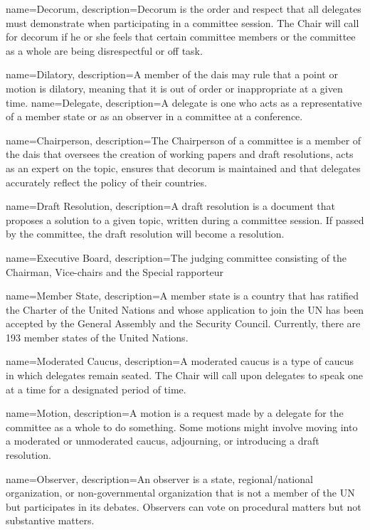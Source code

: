 {
	name={Decorum},
	description={Decorum is the order and respect that all delegates must demonstrate when participating in a committee session. The Chair will call for decorum if he or she feels that certain committee members or the committee as a whole are being disrespectful or off task.}

{
	name={Dilatory},
	description={A member of the dais may rule that a point or motion is dilatory, meaning that it is out of order or inappropriate at a given time.}
}
{
	name={Delegate},
	description={A delegate is one who acts as a representative of a member state or as an observer in a committee at a conference.}
}

{
	name={Chairperson},
	description={The Chairperson of a committee is a member of the dais that oversees the creation of working papers and draft resolutions, acts as an expert on the topic, ensures that decorum is maintained and that delegates accurately reflect the policy of their countries.}
}

{
	name={Draft Resolution},
	description={A draft resolution is a document that proposes a solution to a given topic, written during a committee session. If passed by the committee, the draft resolution will become a resolution.}
}

{
	name={Executive Board},
	description={The judging committee consisting of the Chairman, Vice-chairs and the Special rapporteur}
}

{
	name={Member State},
	description={A member state is a country that has ratified the Charter of the United Nations and whose application to join the UN has been accepted by the General Assembly and the Security Council. Currently, there are 193 member states of the United Nations.}
}

{
	name={Moderated Caucus},
	description={A moderated caucus is a type of caucus in which delegates remain seated. The Chair will call upon delegates to speak one at a time for a designated period of time.}
}

{
	name={Motion},
	description={A motion is a request made by a delegate for the committee as a whole to do something. Some motions might involve moving into a moderated or unmoderated caucus, adjourning, or introducing a draft resolution.}
}

	name={Observer},
	description={An observer is a state, regional/national organization, or non-governmental organization that is not a member of the UN but participates in its debates. Observers can vote on procedural matters but not substantive matters.}
}

